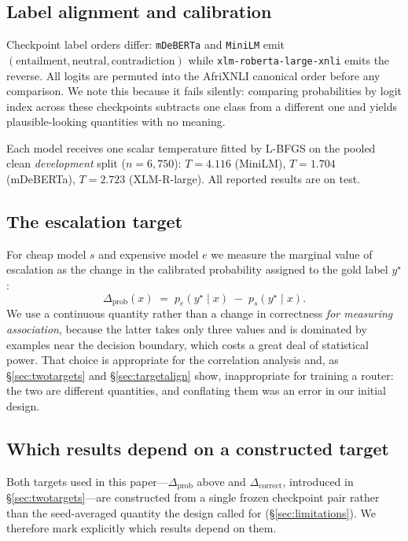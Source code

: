 \documentclass[11pt]{article}
\begin{document}
\subsection{Label alignment and calibration}
Checkpoint label orders differ: \texttt{mDeBERTa} and \texttt{MiniLM} emit
$(\text{entailment}, \text{neutral}, \text{contradiction})$ while
\texttt{xlm-roberta-large-xnli} emits the reverse. All logits are permuted into
the AfriXNLI canonical order before any comparison. We note this because it fails
silently: comparing probabilities by logit index across these checkpoints
subtracts one class from a different one and yields plausible-looking quantities
with no meaning.

Each model receives one scalar temperature fitted by L-BFGS on the pooled clean
\emph{development} split ($n=6{,}750$): $T=4.116$ (MiniLM), $T=1.704$
(mDeBERTa), $T=2.723$ (XLM-R-large). All reported results are on test.

\subsection{The escalation target}
\label{sec:delta}
For cheap model $s$ and expensive model $e$ we measure the marginal value of
escalation as the change in the calibrated probability assigned to the gold
label $y^\star$:
\begin{equation}
\Delta_{\mathrm{prob}}(x) \;=\; p_e(y^\star \mid x) \;-\; p_s(y^\star \mid x).
\label{eq:dprob}
\end{equation}
We use a continuous quantity rather than a change in correctness \emph{for
measuring association}, because the latter takes only three values and is
dominated by examples near the decision boundary, which costs a great deal of
statistical power. That choice is appropriate for the correlation analysis and,
as \S\ref{sec:twotargets} and \S\ref{sec:targetalign} show, inappropriate for
training a router: the two are different quantities, and conflating them was an
error in our initial design.

\subsection{Which results depend on a constructed target}
\label{sec:dependency}
Both targets used in this paper---$\Delta_{\mathrm{prob}}$ above and
$\Delta_{\mathrm{correct}}$, introduced in \S\ref{sec:twotargets}---are
constructed from a single frozen checkpoint pair rather than the seed-averaged
quantity the design called for (\S\ref{sec:limitations}). We therefore mark
explicitly which results depend on them.
\end{document}
